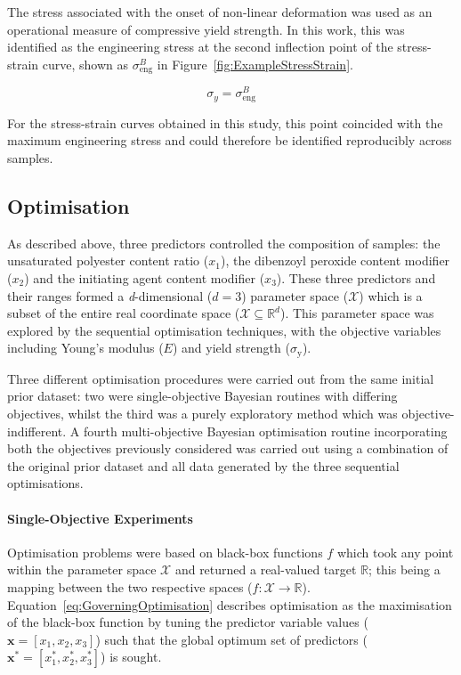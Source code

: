 The stress associated with the onset of non-linear deformation was used as
 an operational measure of compressive yield strength.
In this work, this was identified as the engineering stress at the second
 inflection point of the stress-strain curve, shown as \(\sigma_{\mathrm{eng}}^{B}\)
 in Figure~\ref{fig:ExampleStressStrain}.

\begin{equation}\label{eq:YieldStrengthDefinition}
    \sigma_{y}=\sigma_{\mathrm{eng}}^{B}
\end{equation}

For the stress-strain curves obtained in this study, this point coincided
 with the maximum engineering stress and could therefore be identified
 reproducibly across samples.

\subsection{Optimisation}
As described above, three predictors controlled the composition of samples:
 the unsaturated polyester content ratio (\(x_{1}\)), the dibenzoyl peroxide
 content modifier (\(x_{2}\)) and the initiating agent content modifier
 (\(x_{3}\)).
These three predictors and their ranges formed a \textit{d}-dimensional 
(\(d=3\)) parameter space (\(\mathcal{X}\)) which is a subset of the entire 
 real coordinate space (\(\mathcal{X}\subseteq \mathbb{R}^{d}\)).
This parameter space was explored by the sequential optimisation techniques,
 with the objective variables including Young's modulus (\(E\)) and yield
 strength (\(\sigma_{\mathrm{y}}\)).

Three different optimisation procedures were carried out from the same
 initial prior dataset: two were single-objective Bayesian routines with
 differing objectives, whilst the third was a purely exploratory method
 which was objective-indifferent.
A fourth multi-objective Bayesian optimisation routine incorporating both
 the objectives previously considered was carried out using a combination of
 the original prior dataset and all data generated by the three sequential
 optimisations.

\paragraph{Single-Objective Experiments}
Optimisation problems were based on black-box functions \(f\) which
 took any point within the parameter space \(\mathcal{X}\) and returned a real-valued
 target \(\mathbb{R}\); this being a mapping between the two respective
 spaces (\(f:\mathcal{X}\rightarrow \mathbb{R}\)).
Equation~\ref{eq:GoverningOptimisation} describes optimisation as the
 maximisation of the black-box function by tuning the predictor variable
 values (\(\mathbf{x}=[x_{1},x_{2},x_{3}]\)) such that the global optimum
 set of predictors (\(\mathbf{x}^{*}=[x_{1}^{*},x_{2}^{*},x_{3}^{*}]\)) is
 sought.

